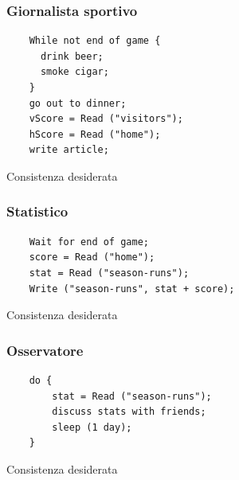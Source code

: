 \begin{frame}[fragile]
 \frametitle{Giornalista sportivo}
  \begin{lstlisting}
    While not end of game {
      drink beer;
      smoke cigar;
    }
    go out to dinner;
    vScore = Read ("visitors");
    hScore = Read ("home");
    write article;
  \end{lstlisting}
  \begin{block}{Consistenza desiderata}
    
  \end{block}
\end{frame}

\begin{frame}[fragile]
 \frametitle{Statistico}
  \begin{lstlisting}
    Wait for end of game;
    score = Read ("home");
    stat = Read ("season-runs");
    Write ("season-runs", stat + score);
  \end{lstlisting}
  \begin{block}{Consistenza desiderata}
   
   \end{block}
\end{frame}

\begin{frame}[fragile]
 \frametitle{Osservatore}
  \begin{lstlisting}
    do {
        stat = Read ("season-runs");
        discuss stats with friends;
        sleep (1 day);
    }
  \end{lstlisting}
  \begin{block}{Consistenza desiderata}
   
  \end{block}
\end{frame}